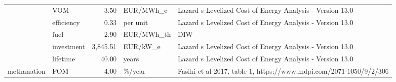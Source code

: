 \begin{longtable}{p{5cm}p{3cm}rp{3cm}p{11cm}}
                      & VOM &           3.50 &                         EUR/MWh\_e &                                                                                                                                                                                                                                                                            Lazard s Levelized Cost of Energy Analysis - Version 13.0 \\
                      & efficiency &           0.33 &                          per unit &                                                                                                                                                                                                                                                                            Lazard s Levelized Cost of Energy Analysis - Version 13.0 \\
                      & fuel &           2.90 &                        EUR/MWh\_th &                                                                                                                                                                                                                                                                                                                                  DIW \\
                      & investment &       3,845.51 &                          EUR/kW\_e &                                                                                                                                                                                                                                                                            Lazard s Levelized Cost of Energy Analysis - Version 13.0 \\
                      & lifetime &          40.00 &                             years &                                                                                                                                                                                                                                                                            Lazard s Levelized Cost of Energy Analysis - Version 13.0 \\
methanation & FOM &           4.00 &                            \%/year &                                                                                                                                                                                                                                                                   Fasihi et al 2017, table 1, https://www.mdpi.com/2071-1050/9/2/306 \\

\end{longtable}
